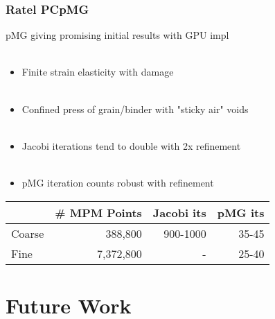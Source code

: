 \documentclass{beamer}
\begin{document}

\begin{frame}
\begin{center}
\frametitle{Ratel PCpMG}

pMG giving promising initial results with GPU impl\\

~\\

\begin{itemize}

\item Finite strain elasticity with damage\\

~\\

\item Confined press of grain/binder with "sticky air" voids\\

~\\

\item Jacobi iterations tend to double with 2x refinement\\

~\\

\item pMG iteration counts robust with refinement\\

\end{itemize}

\begin{table}[ht!]
\begin{center}
\begin{tabular}{l r r r}
  \toprule
             & \# MPM Points & Jacobi its & pMG its  \\
  \toprule
  Coarse     &       388,800 &   900-1000 & 35-45    \\
  Fine       &     7,372,800 &      -     & 25-40    \\
  \bottomrule
\end{tabular}
\end{center}
\end{table}

\end{center}
\end{frame}


\section{Future Work}
\end{document}
